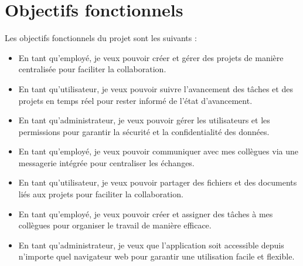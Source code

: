 \section{Objectifs fonctionnels}

Les objectifs fonctionnels du projet sont les suivants :

\begin{itemize}
  \item En tant qu'employé, je veux pouvoir créer et gérer des projets de manière centralisée pour faciliter la collaboration.
  \item En tant qu'utilisateur, je veux pouvoir suivre l'avancement des tâches et des projets en temps réel pour rester informé de l'état d'avancement.
  \item En tant qu'administrateur, je veux pouvoir gérer les utilisateurs et les permissions pour garantir la sécurité et la confidentialité des données.
  \item En tant qu'employé, je veux pouvoir communiquer avec mes collègues via une messagerie intégrée pour centraliser les échanges.
  \item En tant qu'utilisateur, je veux pouvoir partager des fichiers et des documents liés aux projets pour faciliter la collaboration.
  \item En tant qu'employé, je veux pouvoir créer et assigner des tâches à mes collègues pour organiser le travail de manière efficace.
  \item En tant qu'administrateur, je veux que l'application soit accessible depuis n'importe quel navigateur web pour garantir une utilisation facile et flexible.
\end{itemize}
